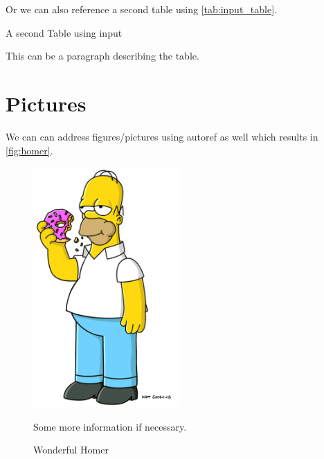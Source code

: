 \documentclass[12pt,a4paper]{article}
\begin{document}
	Or we can also reference a second table using \autoref{tab:input_table}.
	
	\begin{table}
		\caption{A second Table using input}
		\label{tab:input_table}
		\centering
		{\scriptsize This can be a paragraph describing the table.\par}
		
	\end{table}

\section{Pictures}

	We can can address figures/pictures using autoref as well which results in \autoref{fig:homer}.
	
	\begin{figure}
		\centering
		\includegraphics[width=0.5\textwidth]{pictures/homer.png} \\
		\caption{Wonderful Homer}
		\label{fig:homer}
		\small Some more information if necessary.
	\end{figure}
	
	
	\newpage
	
	\printbibliography
	
\end{document}
